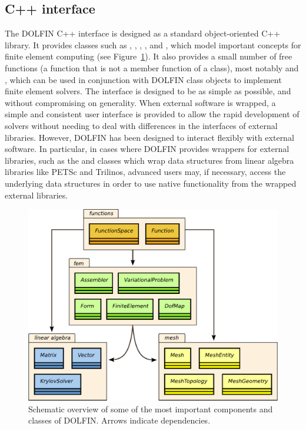 \subsection{C++ interface}

The DOLFIN C++ interface is designed as a standard object-oriented
C++ library. It provides classes such as , ,
, ,  and ,
which model important concepts for finite element computing (see
Figure~\ref{fig:logg-2:uml}). It also provides a small number of free
functions (a function that is not a member function of a class),
most notably  and , which can be used in
conjunction with DOLFIN class objects to implement finite element
solvers. The interface is designed to be as simple as possible, and
without compromising on generality.  When external software is wrapped,
a simple and consistent user interface is provided to allow the rapid
development of solvers without needing to deal with differences in the
interfaces of external libraries. However, DOLFIN has been designed to
interact flexibly with external software. In particular, in cases where
DOLFIN provides wrappers for external libraries, such as the 
and  classes which wrap data structures from linear algebra
libraries like PETSc and Trilinos, advanced users may, if necessary,
access the underlying data structures in order to use native functionality
from the wrapped external libraries.

\begin{figure}
\bwfig
  \centering
  \includegraphics[width=\largefig]{chapters/logg-2/pdf/dolfin-uml.pdf}
  \caption{Schematic overview of some of the most important components
  and classes of DOLFIN. Arrows indicate dependencies.}
  \label{fig:logg-2:uml}
\end{figure}

